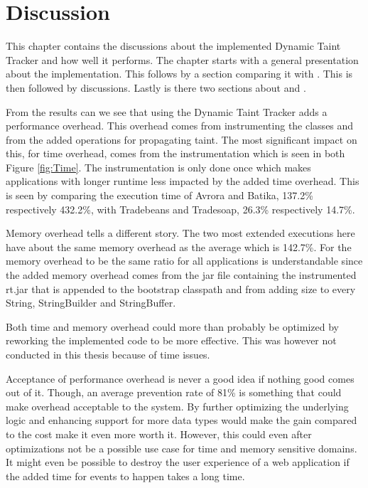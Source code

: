 \chapter{Discussion}
This chapter contains the discussions about the implemented Dynamic Taint Tracker and how well it performs. The chapter starts with a general presentation about the implementation. This follows by a section comparing it with \textit{}. This is then followed by \textit{} discussions. Lastly is there two sections about \textit{} and \textit{}.

From the results can we see that using the Dynamic Taint Tracker adds a performance overhead. This overhead comes from instrumenting the classes and from the added operations for propagating taint. The most significant impact on this, for time overhead, comes from the instrumentation which is seen in both Figure \ref{fig:Time}. The instrumentation is only done once which makes applications with longer runtime less impacted by the added time overhead. This is seen by comparing the execution time of Avrora and Batika, 137.2\% respectively 432.2\%, with Tradebeans and Tradesoap, 26.3\% respectively 14.7\%.

Memory overhead tells a different story. The two most extended executions here have about the same memory overhead as the average which is 142.7\%. For the memory overhead to be the same ratio for all applications is understandable since the added memory overhead comes from the jar file containing the instrumented rt.jar that is appended to the bootstrap classpath and from adding size to every String, StringBuilder and StringBuffer.

Both time and memory overhead could more than probably be optimized by reworking the implemented code to be more effective. This was however not conducted in this thesis because of time issues.

Acceptance of performance overhead is never a good idea if nothing good comes out of it. Though, an average prevention rate of 81\% is something that could make overhead acceptable to the system. By further optimizing the underlying logic and enhancing support for more data types would make the gain compared to the cost make it even more worth it. However, this could even after optimizations not be a possible use case for time and memory sensitive domains. It might even be possible to destroy the user experience of a web application if the added time for events to happen takes a long time.



